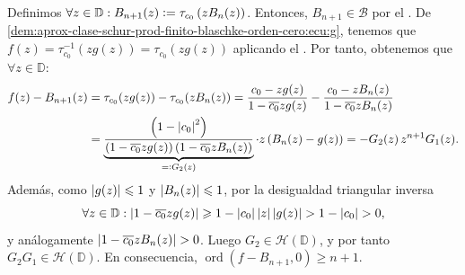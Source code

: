\begin{dem}
    Definimos $\forall z \in \mathbb{D} : B_{n+1}(z) \vcentcolon= \tau_{c_0}\left( z B_n(z) \right)$. Entonces, $B_{n+1} \in \mathscr{B}$ por el . De \eqref{dem:aprox-clase-schur-prod-finito-blaschke-orden-cero:ecu:g}, tenemos que $f(z) = \tau_{c_0}^{-1} (z g(z)) = \tau_{c_0} (z g(z))$ aplicando el . Por tanto, obtenemos que $\forall z \in \mathbb{D} : $
    \[
    \begin{aligned}
        f(z) - B_{n+1}(z) &= \tau_{c_0} (z g(z)) - \tau_{c_0} (z B_n(z)) = \frac{c_0 - z g(z)}{1 - \overline{c_0} z g(z)} - \frac{c_0 - z B_n(z)}{1 - \overline{c_0} z B_n(z)}
        \\
        &= \underbrace{\frac{\left(1 - \left|c_0\right|^2 \right)}{\left(1 - \overline{c_0} z g(z) \right) \left(1 - \overline{c_0} z B_n(z) \right)}}_{=\vcentcolon G_2(z)} \cdot z \left(B_n(z) - g(z) \right) = - G_2(z)\, z^{n+1} G_1(z).
    \end{aligned}
    \]
    Además, como $\left|g(z)\right| \leqslant 1$ y $\left|B_n(z)\right| \leqslant 1$, por la desigualdad triangular inversa 
    \[
        \forall z \in \mathbb{D} : \left|1 - \overline{c_0} z g(z)\right| \geqslant 1 - \left|c_0\right|\left|z\right|\left|g(z)\right| > 1 - \left|c_0\right| > 0,
    \]
    y análogamente $\left|1 - \overline{c_0} z B_n(z)\right| > 0$. Luego $G_2 \in \mathcal{H}(\mathbb{D})$, y por tanto $G_2G_1 \in \mathcal{H}(\mathbb{D})$. En consecuencia, $\operatorname{ord}(f - B_{n+1}, 0) \geq n+1$.\hfill\qedsymbol
\end{dem}

